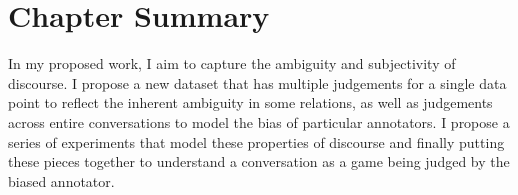 \section{Chapter Summary}
In my proposed work, I aim to capture the ambiguity and subjectivity of discourse. I propose a new dataset that has multiple judgements for a single data point to reflect the inherent ambiguity in some relations, as well as judgements across entire conversations to model the bias of particular annotators. I propose a series of experiments that model these properties of discourse and finally putting these pieces together to understand a conversation as a game being judged by the biased annotator.  